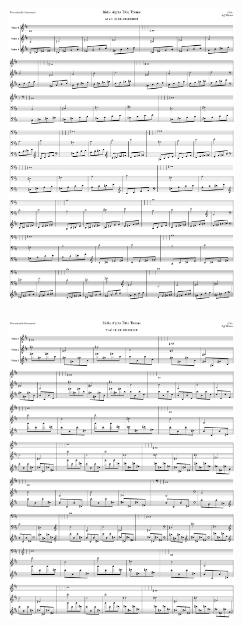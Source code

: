 \begin{figure}[H]                                             
{                                                             
  \setlength{\tabcolsep}{3.0pt}                               
  \setlength\cmidrulewidth{\heavyrulewidth} %
    \begin{subfigure}{0.5\textwidth}                            
  \includegraphics[width=6cm]{music/title_no_69_page_1001.png}%
    \end{subfigure}                                             
  \begin{subfigure}{0.5\textwidth}                            
  \includegraphics[width=6cm]{music/title_no_70_page_1001.png}%
    \end{subfigure}                                             
}                                                             
\end{figure}                                                  


